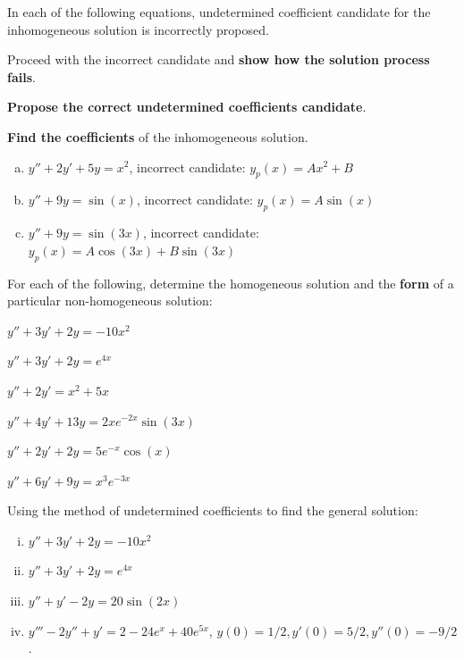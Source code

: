   \begin{question}
    In each of the following equations, undetermined coefficient candidate for the inhomogeneous solution is incorrectly proposed.
    \begin{compactitem}
      \item Proceed with the incorrect candidate and \textbf{show how the solution process fails}.
      \item \textbf{Propose the correct undetermined coefficients candidate}.
      \item \textbf{Find the coefficients} of the inhomogeneous solution.
    \end{compactitem}
    
    \begin{enumerate}[(a)]
      \item \(y'' + 2y' + 5y = x^{2}\), incorrect candidate: \(y_{p}(x) = A x^{2} + B\)
      \item \(y'' + 9 y = \sin(x)\), incorrect candidate: \(y_{p}(x) = A \sin(x)\)
      \item \(y'' + 9 y = \sin(3x)\), incorrect candidate: \(y_{p}(x) = A \cos(3x) + B\sin(3x)\)
    \end{enumerate}
  \end{question}

  \begin{question}
    For each of the following, determine the homogeneous solution and the \textbf{form} of a particular non-homogeneous solution:
    \begin{colenumerate}
      \item $y''+3y'+2y = -10x^2$
      \item $y''+3y'+2y =e^{4x}$
      \item $y''+2y'=x^2+5x$
      \item $y''+4y'+13y = 2xe^{-2x}\sin(3x)$
      \item $y''+2y'+2y=5e^{-x}\cos(x)$
      \item $y''+6y'+9y = x^3e^{-3x}$
    \end{colenumerate}
  \end{question}

  \begin{question}
    Using the method of undetermined coefficients to find the general solution:
    \begin{enumerate}[(i)]
      \item $y''+3y'+2y=-10x^2$
      \item $y''+3y'+2y =e^{4x}$
      \item $y''+y'-2y = 20\sin(2x)$
      \item $y'''-2y''+y' = 2-24 e^x +40 e^{5x}$, $y(0) = 1/2, y'(0)=5/2, y''(0) = -9/2$.
    \end{enumerate}
  \end{question}

